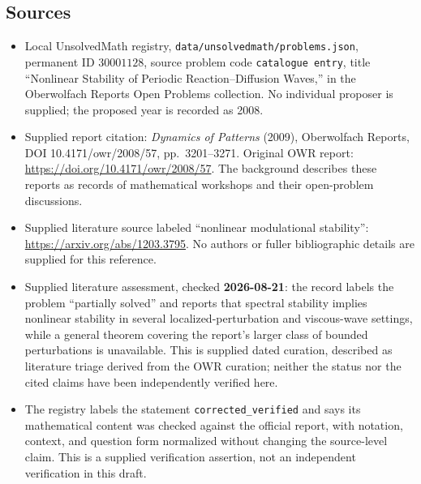 \documentclass[11pt]{article}
\begin{document}
\subsection{Sources}
\begin{itemize}
\item Local UnsolvedMath registry, \texttt{data/unsolvedmath/problems.json}, permanent ID \(30001128\), source problem code \texttt{catalogue entry}, title ``Nonlinear Stability of Periodic Reaction--Diffusion Waves,'' in the Oberwolfach Reports Open Problems collection. No individual proposer is supplied; the proposed year is recorded as 2008.
\item Supplied report citation: \emph{Dynamics of Patterns} (2009), Oberwolfach Reports, DOI 10.4171/owr/2008/57, pp.\ 3201--3271. Original OWR report: \url{https://doi.org/10.4171/owr/2008/57}. The background describes these reports as records of mathematical workshops and their open-problem discussions.
\item Supplied literature source labeled ``nonlinear modulational stability'': \url{https://arxiv.org/abs/1203.3795}. No authors or fuller bibliographic details are supplied for this reference.
\item Supplied literature assessment, checked \textbf{2026-08-21}: the record labels the problem ``partially solved'' and reports that spectral stability implies nonlinear stability in several localized-perturbation and viscous-wave settings, while a general theorem covering the report's larger class of bounded perturbations is unavailable. This is supplied dated curation, described as literature triage derived from the OWR curation; neither the status nor the cited claims have been independently verified here.
\item The registry labels the statement \texttt{corrected\_verified} and says its mathematical content was checked against the official report, with notation, context, and question form normalized without changing the source-level claim. This is a supplied verification assertion, not an independent verification in this draft.
\end{itemize}
\end{document}

